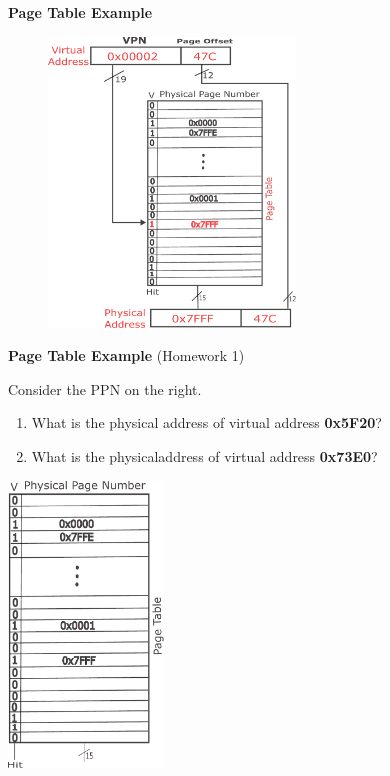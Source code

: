 \documentclass[11pt, table, aspectratio=169]{beamer}
\begin{document}
\begin{frame}{\textbf{Page Table Example}}
	\begin{figure}
		\centering 
		\includegraphics[height=7.7cm, width=0.6 \linewidth]{pic/pageTable3.pdf}
	\end{figure}
\end{frame}


\begin{frame}{\textbf{Page Table Example} (Homework 1)}
	\begin{minipage}{0.5\textwidth}
Consider the PPN on the right. 
	
	\begin{enumerate}
		\item What is the physical address of virtual address \textbf{0x5F20}?
		\item What is the physicaladdress of virtual address \textbf{0x73E0}?
	\end{enumerate}
	\end{minipage}%
	\begin{minipage}{0.5\textwidth}
		\centering
		\includegraphics[height=7.6cm, width=0.8 \linewidth]{pic/homework2.pdf}
	\end{minipage}
\end{frame}
\end{document}

